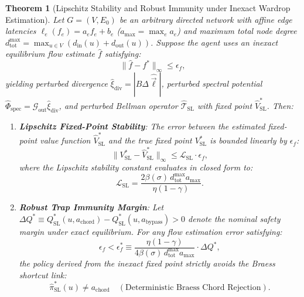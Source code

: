 \documentclass[11pt,a4paper]{article}
\newtheorem{theorem}{Theorem}
\begin{document}
\begin{theorem}[Lipschitz Stability and Robust Immunity under Inexact Wardrop Estimation]
\label{thm:lipschitz_stability}
Let $G = (V, E_0)$ be an arbitrary directed network with affine edge latencies $\ell_e(f_e) = a_e f_e + b_e$ ($a_{\max} = \max_e a_e$) and maximum total node degree $d_{\text{tot}}^{\max} = \max_{u \in V} (d_{\text{in}}(u) + d_{\text{out}}(u))$. Suppose the agent uses an inexact equilibrium flow estimate $\hat{f}$ satisfying:
\begin{equation}
\label{eq:flow_estimation_error}
\|\hat{f} - f^*\|_\infty \le \epsilon_f,
\end{equation}
yielding perturbed divergence $\hat{\xi}_{\text{div}} = |B \Delta \hat{\vec{\ell}}|$, perturbed spectral potential $\hat{\Phi}_{\text{spec}} = \mathcal{G}_{\text{out}} \hat{\xi}_{\text{div}}$, and perturbed Bellman operator $\hat{\mathcal{T}}_{\text{SL}}$ with fixed point $\hat{V}_{\text{SL}}^*$. Then:
\begin{enumerate}
    \item \textbf{Lipschitz Fixed-Point Stability}: The error between the estimated fixed-point value function $\hat{V}_{\text{SL}}^*$ and the true fixed point $V_{\text{SL}}^*$ is bounded linearly by $\epsilon_f$:
    \begin{equation}
    \label{eq:lipschitz_fixed_point_bound}
    \|V_{\text{SL}}^* - \hat{V}_{\text{SL}}^*\|_\infty \le \mathcal{L}_{\text{SL}} \cdot \epsilon_f,
    \end{equation}
    where the Lipschitz stability constant evaluates in closed form to:
    \begin{equation}
    \label{eq:lipschitz_constant}
    \mathcal{L}_{\text{SL}} = \frac{2 \beta(\sigma) \, d_{\text{tot}}^{\max} a_{\max}}{\eta (1 - \gamma)}.
    \end{equation}
    \item \textbf{Robust Trap Immunity Margin}: Let $\Delta Q^* \equiv Q_{\text{SL}}^*(u, a_{\text{chord}}) - Q_{\text{SL}}^*(u, a_{\text{bypass}}) > 0$ denote the nominal safety margin under exact equilibrium. For any flow estimation error satisfying:
    \begin{equation}
    \label{eq:robust_error_radius}
    \epsilon_f < \epsilon_f^* \equiv \frac{\eta (1 - \gamma)}{4 \beta(\sigma) \, d_{\text{tot}}^{\max} a_{\max}} \cdot \Delta Q^*,
    \end{equation}
    the policy derived from the inexact fixed point strictly avoids the Braess shortcut link:
    \begin{equation}
    \hat{\pi}_{\text{SL}}^*(u) \ne a_{\text{chord}} \quad (\text{Deterministic Braess Chord Rejection}).
    \end{equation}
\end{enumerate}
\end{theorem}
\end{document}
